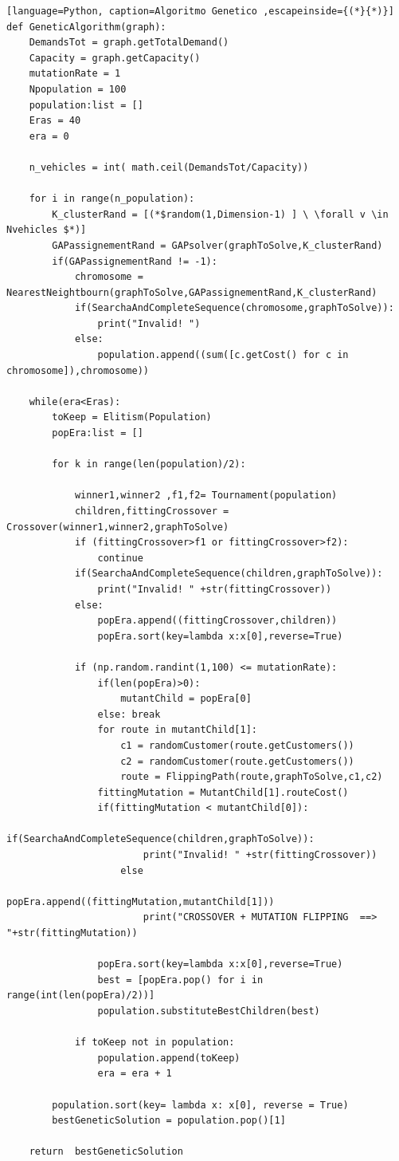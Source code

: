 \documentclass[]{article}
\begin{document}
\begin{lstlisting}[language=Python, caption=Algoritmo Genetico ,escapeinside={(*}{*)}]
def GeneticAlgorithm(graph):
	DemandsTot = graph.getTotalDemand() 
	Capacity = graph.getCapacity()
	mutationRate = 1
	Npopulation = 100
	population:list = []
	Eras = 40
	era = 0
	
	n_vehicles = int( math.ceil(DemandsTot/Capacity))           
	
	for i in range(n_population):
		K_clusterRand = [(*$random(1,Dimension-1) ] \ \forall v \in Nvehicles $*)]
		GAPassignementRand = GAPsolver(graphToSolve,K_clusterRand)
		if(GAPassignementRand != -1):
			chromosome = NearestNeightbourn(graphToSolve,GAPassignementRand,K_clusterRand) 
			if(SearchaAndCompleteSequence(chromosome,graphToSolve)):
				print("Invalid! ")
			else:
				population.append((sum([c.getCost() for c in chromosome]),chromosome))
			
	while(era<Eras):
		toKeep = Elitism(Population)
		popEra:list = []
		
		for k in range(len(population)/2):
		
			winner1,winner2 ,f1,f2= Tournament(population)   
			children,fittingCrossover = Crossover(winner1,winner2,graphToSolve)
			if (fittingCrossover>f1 or fittingCrossover>f2):
				continue			
			if(SearchaAndCompleteSequence(children,graphToSolve)):
				print("Invalid! " +str(fittingCrossover))
			else:
				popEra.append((fittingCrossover,children))
				popEra.sort(key=lambda x:x[0],reverse=True)	
						
			if (np.random.randint(1,100) <= mutationRate):
			    if(len(popEra)>0):
			    	mutantChild = popEra[0]
			    else: break 
				for route in mutantChild[1]:
					c1 = randomCustomer(route.getCustomers())
					c2 = randomCustomer(route.getCustomers())
					route = FlippingPath(route,graphToSolve,c1,c2)					
				fittingMutation = MutantChild[1].routeCost()
				if(fittingMutation < mutantChild[0]):
					if(SearchaAndCompleteSequence(children,graphToSolve)):
						print("Invalid! " +str(fittingCrossover))
					else
						popEra.append((fittingMutation,mutantChild[1]))
						print("CROSSOVER + MUTATION FLIPPING  ==> "+str(fittingMutation))
										
				popEra.sort(key=lambda x:x[0],reverse=True)
				best = [popEra.pop() for i in range(int(len(popEra)/2))]			
				population.substituteBestChildren(best)
			
			if toKeep not in population:
				population.append(toKeep)
				era = era + 1
			
		population.sort(key= lambda x: x[0], reverse = True)
		bestGeneticSolution = population.pop()[1]    
	
	return 	bestGeneticSolution
\end{lstlisting}
\end{document}
